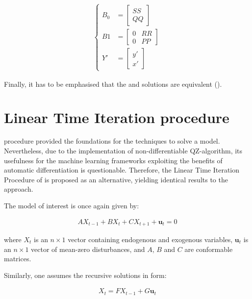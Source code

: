 \documentclass{pracamgr}
\numberwithin{equation}{section}
\begin{document}
\begin{align}
\left\{
\begin{array}{cl}
B_{0} &= \begin{bmatrix}
    SS \\
    QQ
\end{bmatrix} \\
B1 &=  \begin{bmatrix}
    0 & RR \\
    0 & PP
\end{bmatrix} \\
Y' &= \begin{bmatrix}
    y' \\
    x'
\end{bmatrix}
\end{array}
\right.
\end{align}

Finally, it has to be emphasised that the \citet{uhlig1998toolkit} and \citet{klein2000using} solutions are equivalent (\citet{bonaldi2010identification}).

\section{Linear Time Iteration procedure} \label{LTI}

\citet{uhlig1998toolkit} procedure provided the foundations for the techniques to solve a  \citet{smets2003estimated} model. Nevertheless, due to the implementation of non-differentiable QZ-algorithm, its usefulness for the machine learning frameworks exploiting the benefits of automatic differentiation is questionable. Therefore, the Linear Time Iteration Procedure of \cite{rendahl2017linear} is proposed as an alternative, yielding identical results to the \citet{uhlig1998toolkit} approach.

The model of interest is once again given by:

\begin{align}
AX_{t-1} + BX_{t} + CX_{t+1} + \mathbf{u}_{t} = 0
\end{align}

where $X_{t}$ is an $n \times 1$ vector containing endogenous and exogenous variables, $\mathbf{u}_{t}$ is an $n \times 1$ vector of mean-zero disturbances, and $A$, $B$ and $C$ are conformable matrices.

Similarly, one assumes the recursive solutions in form:

\begin{align}
X_{t} = FX_{t-1} + G\mathbf{u}_{t}
\end{align}
\end{document}
